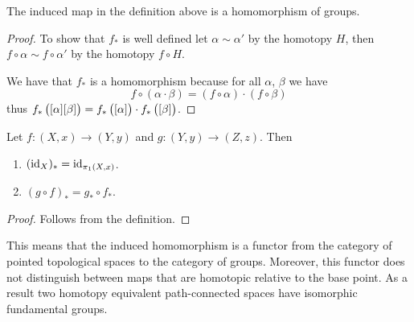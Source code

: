 \documentclass[11pt,a4paper]{article}
\begin{document}
\begin{proposition}
  The induced map in the definition above is a homomorphism of groups.
\end{proposition}
\begin{proof}
  To show that $f_*$ is well defined let $\alpha \sim \alpha'$ by the
  homotopy $H$,
  then $f \circ \alpha \sim f \circ \alpha'$ by the homotopy $f \circ H$.

  We have that $f_*$ is a homomorphism because for all $\alpha$, $\beta$ we
  have
  \[
    f \circ (\alpha \cdot \beta) = (f \circ \alpha) \cdot (f \circ \beta)
  \]
  thus $f_*\del{[\alpha] [\beta]} = f_*\del{[\alpha]} \cdot f_*\del{[\beta]}$.
\end{proof}

\begin{proposition}
  Let $f \colon (X,x) \to (Y,y)$ and $g \colon (Y,y) \to (Z,z)$.
  Then
  \begin{enumerate}
    \item[(1)] $(\operatorname{id}_X)_* = \operatorname{id}_{\pi_1(X,x)}$.
    \item[(2)] $(g \circ f)_* = g_* \circ f_*$.
  \end{enumerate}
\end{proposition}
\begin{proof}
  Follows from the definition.
\end{proof}
\begin{remark}
  This means that the induced homomorphism is a functor from the category
  of pointed topological spaces to the category of groups.
  Moreover, this functor does not distinguish between maps that are
  homotopic relative to the base point.
  As a result two homotopy equivalent path-connected spaces have isomorphic
  fundamental groups.
\end{remark}
\end{document}
